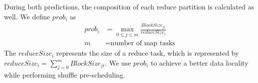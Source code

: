 During both predictions, the composition of each reduce partition is calculated as well. We define $prob_i$ as
\begin{equation}
\label{equationprob}
\begin{aligned}
	prob_i &= \max_{0 \leq j \leq m} \frac{BlockSize_{ji}}{reduceSize_i} \\
	m &= \text{number of map tasks}
\end{aligned}
\end{equation}
The $reduceSize_i$ represents the size of a reduce task, which is represented by $reduceSize_i = \sum_{j=0}^{m} {BlockSize_{ji}}$.
We use $prob_i$ to achieve a better data locality while performing shuffle pre-scheduling. 

